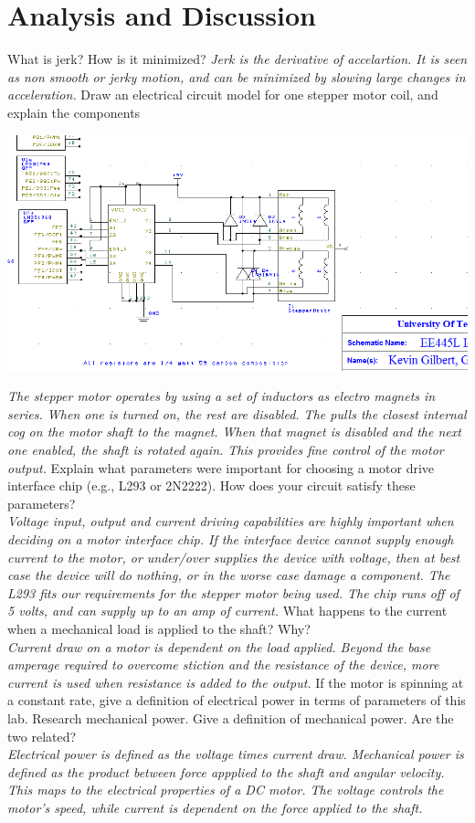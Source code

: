 \documentclass[twoside]{article}
\begin{document}
\section*{Analysis and Discussion}
\begin{pset}
  What is jerk? How is it minimized?
  \emph{Jerk is the derivative of accelartion. It is seen as non smooth or jerky motion, and can be minimized by slowing large changes in acceleration.}
  Draw an electrical circuit model for one stepper motor coil, and explain the components
  \vskip 0.25in
\centerline{\includegraphics[width=1\textwidth]{stepper}}
  \vskip 0.1in
  \emph{The stepper motor operates by using a set of inductors as electro magnets in series. When one is turned on, the rest are disabled. The pulls the closest internal cog on the motor shaft to the magnet. When that magnet is disabled and the next one enabled, the shaft is rotated again. This provides fine control of the motor output.}
  Explain what parameters were important for choosing a motor drive interface chip (e.g., L293 or 2N2222). How does your circuit satisfy these parameters?\\
  \emph{Voltage input, output and current driving capabilities are highly important when deciding on a motor interface chip. If the interface device cannot supply enough current to the motor, or under/over supplies the device with voltage, then at best case the device will do nothing, or in the worse case damage a component. The L293 fits our requirements for the stepper motor being used. The chip runs off of 5 volts, and can supply up to an amp of current.}
  What happens to the current when a mechanical load is applied to the shaft? Why? \\
  \emph{Current draw on a motor is dependent on the load applied. Beyond the base amperage required to overcome stiction and the resistance of the device, more current is used when resistance is added to the output.}
  If the motor is spinning at a constant rate, give a definition of electrical power in terms of parameters of this lab. Research mechanical power. Give a definition of mechanical power. Are the two related? \\
  \emph{Electrical power is defined as the voltage times current draw. Mechanical power is defined as the product between force appplied to the shaft and angular velocity. This maps to the electrical properties of a DC motor. The voltage controls the motor's speed, while current is dependent on the force applied to the shaft.}
\end{pset}
\end{document}
